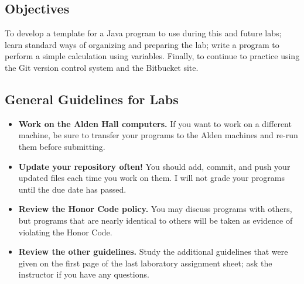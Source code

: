 


\vspace*{-.25in}

\subsection*{Objectives}

To develop a template for a Java program to use during this and future labs; learn standard ways of organizing and
preparing the lab; write a program to perform a simple calculation using variables. Finally, to continue to practice
using the Git version control system and the Bitbucket site.

\vspace*{-.1in}

\subsection*{General Guidelines for Labs}

\begin{itemize}

\setlength\itemsep{.2em}

\item {\bf Work on the Alden Hall computers.} If you want to work on a different machine, be sure to transfer your
  programs to the Alden machines and re-run them before submitting.

\item {\bf Update your repository often!} You should add, commit, and push your updated files each time you work on
  them.  I will not grade your programs until the due date has passed.

\item {\bf Review the Honor Code policy.} You may discuss programs with others, but programs that are nearly identical
  to others will be taken as evidence of violating the Honor Code.

\item {\bf Review the other guidelines.} Study the additional guidelines that were given on the first page of the last
  laboratory assignment sheet; ask the instructor if you have any questions.

\end{itemize}

